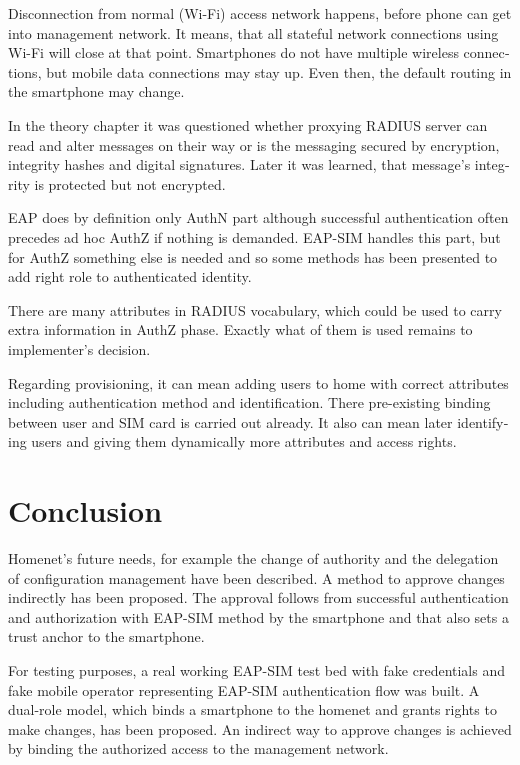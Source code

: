 \documentclass[12pt,a4paper,english]{tutthesis}
\begin{document}
\begin{otherlanguage}{english}
Disconnection from normal (Wi-Fi) access network happens, before phone can get
into management network. It means, that all stateful network
connections using Wi-Fi will close at that point. Smartphones do not
have multiple wireless connections, but mobile data connections may 
stay up. Even then, the default routing in the smartphone may change.

In the theory chapter it was questioned whether proxying RADIUS server
can read and alter messages on their way or is the messaging secured
by encryption, integrity hashes and digital signatures.
Later it was learned, that message's integrity is protected but not encrypted.

EAP does by definition only AuthN part although successful
authentication often precedes ad hoc AuthZ if nothing is demanded.
EAP-SIM handles this part, but for AuthZ something else is needed
and so some methods has been presented to add right role to 
authenticated identity.

There are many attributes in RADIUS vocabulary, which could be 
used to carry extra information in AuthZ phase. Exactly what 
of them is used remains to implementer's  decision.

Regarding provisioning, it can mean adding users to home with correct
attributes including authentication method and identification.
There pre-existing binding between user and SIM card is carried out
already. 
It also can mean later identifying users and giving them 
dynamically more attributes and access rights.


\chapter{Conclusion}
\label{sec-7}




Homenet's future needs, for example  the change of authority and the
delegation of configuration management have been described.
A method to approve changes indirectly has been proposed. The approval
follows from successful authentication and authorization with EAP-SIM
method by the smartphone and that also sets a trust anchor to the smartphone.


For testing purposes, a real working EAP-SIM test bed with fake credentials and
fake mobile operator representing EAP-SIM authentication flow was
built. A dual-role model, which binds a smartphone to the homenet and
grants rights to make changes, has been proposed.  
An indirect way to approve changes is achieved by binding the authorized
access to the management network.


\end{otherlanguage}
\end{document}
